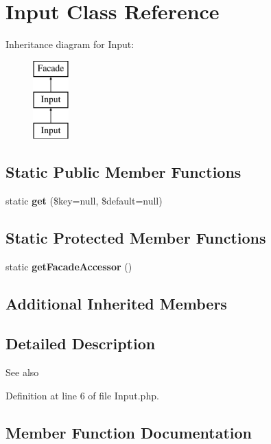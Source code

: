 \section{Input Class Reference}
\label{class_illuminate_1_1_support_1_1_facades_1_1_input}
Inheritance diagram for Input\+:\begin{figure}[H]
\begin{center}
\leavevmode
\includegraphics[height=3.000000cm]{class_illuminate_1_1_support_1_1_facades_1_1_input}
\end{center}
\end{figure}
\subsection*{Static Public Member Functions}
\begin{DoxyCompactItemize}
\item 
static {\bf get} (\$key=null, \$default=null)
\end{DoxyCompactItemize}
\subsection*{Static Protected Member Functions}
\begin{DoxyCompactItemize}
\item 
static {\bf get\+Facade\+Accessor} ()
\end{DoxyCompactItemize}
\subsection*{Additional Inherited Members}


\subsection{Detailed Description}
\begin{DoxySeeAlso}{See also}

\end{DoxySeeAlso}


Definition at line 6 of file Input.\+php.



\subsection{Member Function Documentation}

